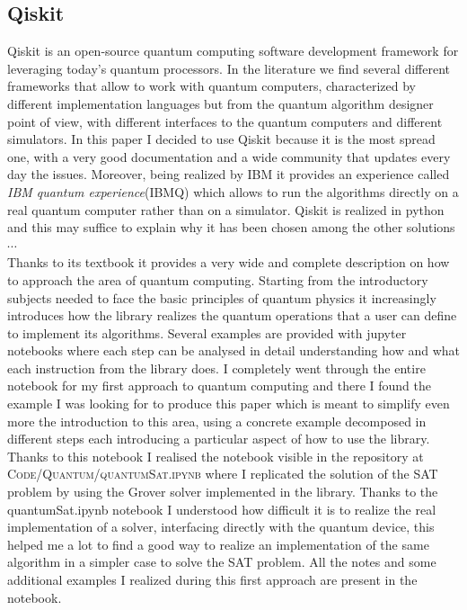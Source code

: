 \documentclass[english]{article}
\begin{document}
	\clearpage
	\begin{appendices}
		\section{Qiskit}
		\label{sec:qiskit}
			Qiskit is an open-source quantum computing software development framework for leveraging today's quantum processors. In the literature we find several different frameworks that allow to work with quantum computers, characterized by different implementation languages but from the quantum algorithm designer point of view, with different interfaces to the quantum computers and different simulators. In this paper I decided to use Qiskit because it is the most spread one, with a very good documentation and a wide community that updates every day the issues. Moreover, being realized by IBM it provides an experience called \emph{IBM quantum experience}(IBMQ) which allows to run the algorithms directly on a real quantum computer rather than on a simulator. Qiskit is realized in python and this may suffice to explain why it has been chosen among the other solutions$\cdots$\\
			
			Thanks to its textbook \cite{qiskitTextbook} it provides a very wide and complete description on how to approach the area of quantum computing. Starting from the introductory subjects needed to face the basic principles of quantum physics it increasingly introduces how the library realizes the quantum operations that a user can define to implement its algorithms. Several examples are provided with jupyter notebooks where each step can be analysed in detail understanding how and what each instruction from the library does. I completely went through the entire notebook for my first approach to quantum computing and there I found the example I was looking for to produce this paper which is meant to simplify even more the introduction to this area, using a concrete example decomposed in different steps each introducing a particular aspect of how to use the library. Thanks to this notebook I realised the notebook visible in the repository at \textsc{Code/Quantum/quantumSat.ipynb} where I replicated the solution of the SAT problem by using the Grover solver implemented in the library. Thanks to the quantumSat.ipynb notebook I understood how difficult it is to realize the real implementation of a solver, interfacing directly with the quantum device, this helped me a lot to find a good way to realize an implementation of the same algorithm in a simpler case to solve the SAT problem. All the notes and some additional examples I realized during this first approach are present in the notebook. \\
			

\end{appendices}
\end{document}
